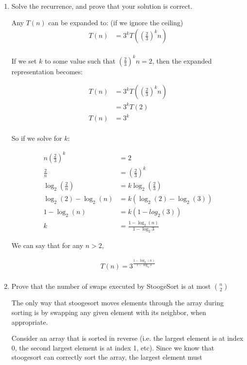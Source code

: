 \documentclass{article}
\newcommand{\question}[1]{\bgroup\color{blue}#1\egroup}
\begin{document}
\begin{enumerate}
\begin{enumerate}
    \item 
      \question{Solve the recurrence, and prove that your solution is correct. }

    Any $T(n)$ can be expanded to: (if we ignore the ceiling)
    \begin{align*}
      T(n) &= 3^k T\left(\left(\frac{2}{3}\right)^k n\right)\\
    \end{align*}

    If we set $k$ to some value such that $\left(\frac{2}{3}\right)^k n = 2$, then the expanded representation becomes:

    \begin{align*}
      T(n) &= 3^k T\left(\left(\frac{2}{3}\right)^k n\right)\\
      &= 3^k T(2)\\
      T(n) &= 3^k\\
    \end{align*}

    So if we solve for $k$:
    
    \begin{align*}
      n \left(\frac{2}{3}\right)^k &= 2\\
      \frac{2}{n} &= \left(\frac{2}{3}\right)^k\\
      \log_2\left(\frac{2}{n}\right) &= k \log_2\left(\frac{2}{3}\right)\\
      \log_2(2) - \log_2(n) &= k\left(\log_2(2) - \log_2(3)\right)\\
      1 - \log_2(n) &= k\left(1 - log_2(3)\right)\\
      k &= \frac{1 - \log_2(n)}{1 - \log_2{3}}
    \end{align*}

    We can say that for any $n > 2$,

    \begin{align*}
      T(n) = 3^{\frac{1 - \log_2(n)}{1 - \log_2{3}}}\\
    \end{align*}

    \item
      \question{Prove that the number of swaps executed by StoogeSort is at most $n \choose 2$}

      The only way that stoogesort moves elements through the array during sorting is by swapping any given element with its neighbor, when appropriate.

      Consider an array that is sorted in reverse (i.e. the largest element is at index 0, the second largest element is at index 1, etc). Since we know that stoogesort can correctly sort the array, the largest element must 



\end{enumerate}
\end{enumerate}
\end{document}
